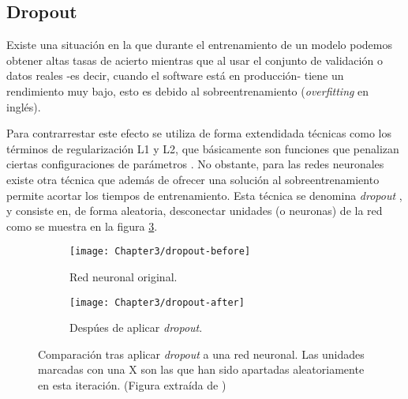 \newpage


\subsection{Dropout}
\label{subs:dropout}

Existe una situación en la que durante el entrenamiento de un modelo podemos obtener altas tasas de acierto mientras que al usar el conjunto de validación o datos reales -es decir, cuando el software está en producción- tiene un rendimiento muy bajo, esto es debido al sobreentrenamiento (\textit{overfitting} en inglés).

Para contrarrestar este efecto se utiliza de forma extendidada técnicas como los términos de regularización L1 y L2,
que básicamente son funciones que penalizan ciertas configuraciones de parámetros \citep{xu2010l1}. No obstante,
para las redes neuronales existe otra técnica que además de ofrecer una solución al sobreentrenamiento permite
acortar los tiempos de entrenamiento. Esta técnica se denomina \textit{dropout} \citep{JMLR:v15:srivastava14a}, y consiste en, de forma aleatoria, desconectar unidades (o neuronas) de la red como se muestra en la figura \ref{fig:dropout}.

\begin{figure}[htp]
    \centering
    \begin{subfigure}[b]{0.3\textwidth}
        \texttt{[image: Chapter3/dropout-before]}
        \caption{Red neuronal original.}
        \label{fig:dropout-before}
    \end{subfigure}
    \qquad
    \begin{subfigure}[b]{0.3\textwidth}
        \texttt{[image: Chapter3/dropout-after]}
        \caption{Despúes de aplicar \textit{dropout}.}
        \label{fig:dropout-after}
    \end{subfigure}
    \caption{Comparación tras aplicar \textit{dropout} a una red neuronal. Las unidades marcadas con una X son las que han sido apartadas aleatoriamente en esta iteración. (Figura extraída de \citep{JMLR:v15:srivastava14a})}\label{fig:dropout}
\end{figure}



